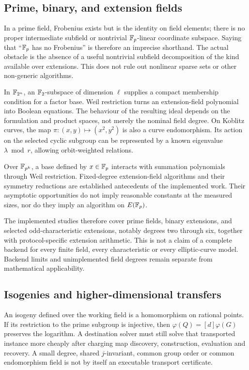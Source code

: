 \subsection{Prime, binary, and extension fields}

In a prime field, Frobenius exists but is the identity on field elements;
there is no proper intermediate subfield or nontrivial $\mathbb F_p$-linear
coordinate subspace. Saying that ``$\mathbb F_p$ has no Frobenius'' is therefore
an imprecise shorthand. The actual obstacle is the absence of a useful
nontrivial subfield decomposition of the kind available over extensions.
This does not rule out nonlinear sparse sets or other non-generic
algorithms.

In $\mathbb F_{2^n}$, an $\mathbb F_2$-subspace of dimension $\ell$ supplies a compact
membership condition for a factor base. Weil restriction turns an
extension-field polynomial into Boolean equations. The behaviour of the
resulting ideal depends on the formulation and product spaces, not merely
the nominal field degree. On Koblitz curves, the map
$\pi:(x,y)\mapsto(x^2,y^2)$ is also a curve endomorphism. Its action on the
selected cyclic subgroup can be represented by a known eigenvalue
$\lambda\bmod r$, allowing orbit-weighted relations.\cite{ggmp2020}

Over $\mathbb F_{p^k}$, a base defined by $x\in\mathbb F_p$ interacts with summation
polynomials through Weil restriction. Fixed-degree extension-field
algorithms and their symmetry reductions are established antecedents of
the implemented work. Their asymptotic opportunities do not imply
reasonable constants at the measured sizes, nor do they imply an
algorithm on $E(\mathbb F_p)$.\cite{gaudry2009,diem2011,fghr2014}

The implemented studies therefore cover prime fields, binary extensions,
and selected odd-characteristic extensions, notably degrees two through
six, together with protocol-specific extension arithmetic. This is not a
claim of a complete backend for every finite field, every characteristic
or every elliptic-curve model. Backend limits and unimplemented field
degrees remain separate from mathematical applicability.

\subsection{Isogenies and higher-dimensional transfers}

An isogeny defined over the working field is a homomorphism on rational
points. If its restriction to the prime subgroup is injective, then
$\varphi(Q)=[d]\varphi(G)$ preserves the logarithm. A destination solver
must still solve that transported instance more cheaply after charging
map discovery, construction, evaluation and recovery. A small degree,
shared $j$-invariant, common group order or common endomorphism field is
not by itself an executable transport certificate.

